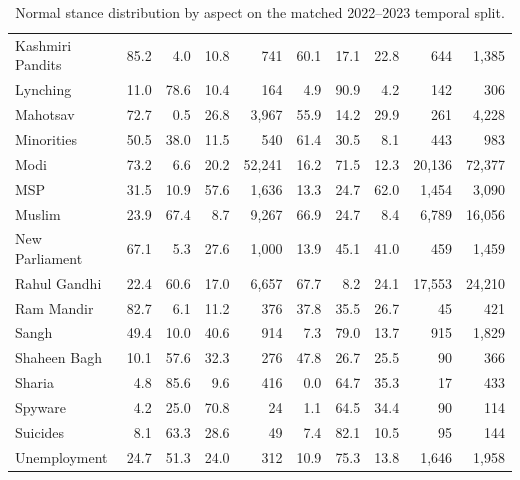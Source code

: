 \begin{table}[htbp]
\begin{tabular}{lrrrrrrrrr}
Kashmiri Pandits & 85.2 & 4.0 & 10.8 & 741 & 60.1 & 17.1 & 22.8 & 644 & 1,385 \\
Lynching & 11.0 & 78.6 & 10.4 & 164 & 4.9 & 90.9 & 4.2 & 142 & 306 \\
Mahotsav & 72.7 & 0.5 & 26.8 & 3,967 & 55.9 & 14.2 & 29.9 & 261 & 4,228 \\
Minorities & 50.5 & 38.0 & 11.5 & 540 & 61.4 & 30.5 & 8.1 & 443 & 983 \\
Modi & 73.2 & 6.6 & 20.2 & 52,241 & 16.2 & 71.5 & 12.3 & 20,136 & 72,377 \\
MSP & 31.5 & 10.9 & 57.6 & 1,636 & 13.3 & 24.7 & 62.0 & 1,454 & 3,090 \\
Muslim & 23.9 & 67.4 & 8.7 & 9,267 & 66.9 & 24.7 & 8.4 & 6,789 & 16,056 \\
New Parliament & 67.1 & 5.3 & 27.6 & 1,000 & 13.9 & 45.1 & 41.0 & 459 & 1,459 \\
Rahul Gandhi & 22.4 & 60.6 & 17.0 & 6,657 & 67.7 & 8.2 & 24.1 & 17,553 & 24,210 \\
Ram Mandir & 82.7 & 6.1 & 11.2 & 376 & 37.8 & 35.5 & 26.7 & 45 & 421 \\
Sangh & 49.4 & 10.0 & 40.6 & 914 & 7.3 & 79.0 & 13.7 & 915 & 1,829 \\
Shaheen Bagh & 10.1 & 57.6 & 32.3 & 276 & 47.8 & 26.7 & 25.5 & 90 & 366 \\
Sharia & 4.8 & 85.6 & 9.6 & 416 & 0.0 & 64.7 & 35.3 & 17 & 433 \\
Spyware & 4.2 & 25.0 & 70.8 & 24 & 1.1 & 64.5 & 34.4 & 90 & 114 \\
Suicides & 8.1 & 63.3 & 28.6 & 49 & 7.4 & 82.1 & 10.5 & 95 & 144 \\
Unemployment & 24.7 & 51.3 & 24.0 & 312 & 10.9 & 75.3 & 13.8 & 1,646 & 1,958 \\
\bottomrule
\end{tabular}
\caption{Normal stance distribution by aspect on the matched 2022--2023 temporal split.}
\label{tab:normal-matched-keyword-stance}
\end{table}
